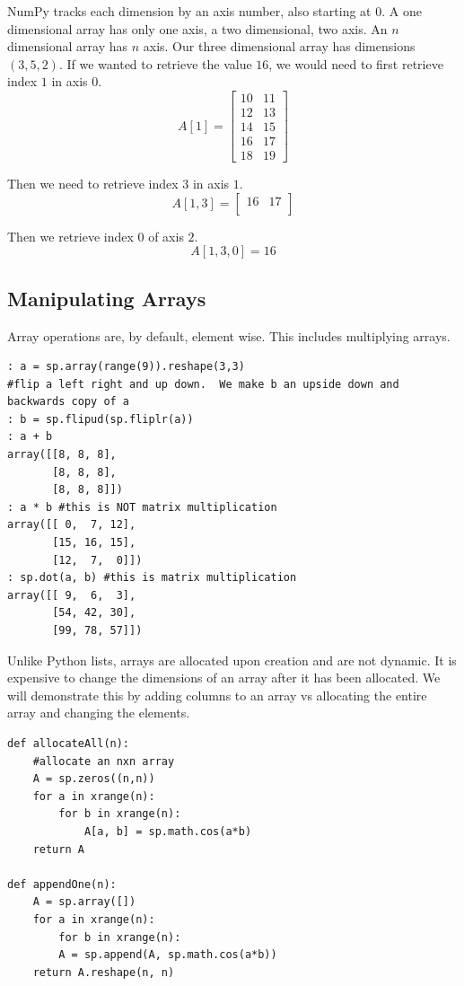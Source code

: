 NumPy tracks each dimension by an axis number, also starting at $0$.  A one dimensional array has only one axis, a two dimensional, two axis.  An $n$ dimensional array has $n$ axis.  Our three dimensional array has dimensions $(3,5,2)$.  If we wanted to retrieve the value $16$, we would need to first retrieve index $1$ in axis $0$.
\[
A[1] = \begin{bmatrix}
10 & 11 \\
12 & 13 \\
14 & 15 \\
16 & 17 \\
18 & 19
\end{bmatrix}
\]

Then we need to retrieve index $3$ in axis $1$.
\[
A[1,3] = \begin{bmatrix}
         16 & 17 \\
         \end{bmatrix}
\]

Then we retrieve index $0$ of axis $2$.
\[
A[1,3,0] = 16
\]

\subsection*{Manipulating Arrays}
Array operations are, by default, element wise.  This includes multiplying arrays.

\begin{lstlisting}[style=python]
: a = sp.array(range(9)).reshape(3,3)
#flip a left right and up down.  We make b an upside down and backwards copy of a
: b = sp.flipud(sp.fliplr(a))
: a + b
array([[8, 8, 8],
       [8, 8, 8],
       [8, 8, 8]])
: a * b #this is NOT matrix multiplication
array([[ 0,  7, 12],
       [15, 16, 15],
       [12,  7,  0]])
: sp.dot(a, b) #this is matrix multiplication
array([[ 9,  6,  3],
       [54, 42, 30],
       [99, 78, 57]])
\end{lstlisting}

Unlike Python lists, arrays are allocated upon creation and are not dynamic.  It is expensive to change the dimensions of an array after it has been allocated.  We will demonstrate this by adding columns to an array vs allocating the entire array and changing the elements.

\begin{lstlisting}[style=python]
def allocateAll(n):
    #allocate an nxn array
    A = sp.zeros((n,n))
    for a in xrange(n):
        for b in xrange(n):
            A[a, b] = sp.math.cos(a*b)
    return A

def appendOne(n):
    A = sp.array([])
    for a in xrange(n):
        for b in xrange(n):
	    A = sp.append(A, sp.math.cos(a*b))
    return A.reshape(n, n)
\end{lstlisting}

